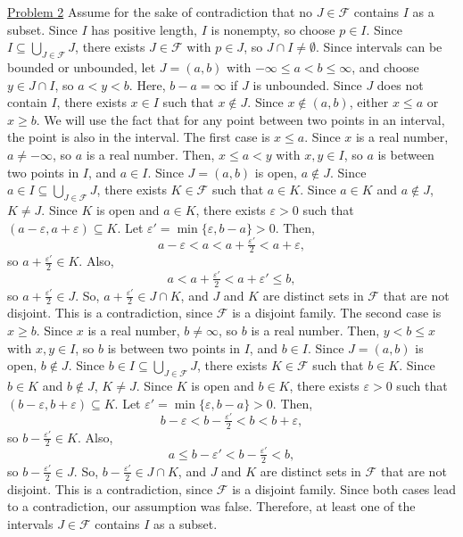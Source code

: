 \documentclass{exam}
\begin{document}
\underline{Problem 2}
\newline
\newline
Assume for the sake of contradiction that no $J\in\mathcal{F}$ contains $I$ as a subset. Since $I$ has positive length, $I$ is nonempty, so choose $p\in I$. Since $I\subseteq\bigcup_{J\in\mathcal{F}}J$, there exists $J\in\mathcal{F}$ with $p\in J$, so $J\cap I\neq\emptyset$. Since intervals can be bounded or unbounded, let $J=(a,b)$ with $-\infty\leq a<b\leq\infty$, and choose $y\in J\cap I$, so $a<y<b$. Here, $b-a=\infty$ if $J$ is unbounded.
\newline
\newline
Since $J$ does not contain $I$, there exists $x\in I$ such that $x\notin J$. Since $x\notin(a,b)$, either $x\leq a$ or $x\geq b$. We will use the fact that for any point between two points in an interval, the point is also in the interval.
\newline
\newline
The first case is $x\leq a$. Since $x$ is a real number, $a\neq-\infty$, so $a$ is a real number. Then, $x\leq a<y$ with $x,y\in I$, so $a$ is between two points in $I$, and $a\in I$. Since $J=(a,b)$ is open, $a\notin J$. Since $a\in I\subseteq\bigcup_{J\in\mathcal{F}}J$, there exists $K\in\mathcal{F}$ such that $a\in K$. Since $a\in K$ and $a\notin J$, $K\neq J$. Since $K$ is open and $a\in K$, there exists $\varepsilon>0$ such that $(a-\varepsilon,a+\varepsilon)\subseteq K$. Let $\varepsilon'=\min\{\varepsilon,b-a\}>0$. Then,
\[
    a-\varepsilon<a<a+\tfrac{\varepsilon'}{2}<a+\varepsilon,
\]
so $a+\frac{\varepsilon'}{2}\in K$. Also,
\[
    a<a+\tfrac{\varepsilon'}{2}<a+\varepsilon'\leq b,
\]
so $a+\frac{\varepsilon'}{2}\in J$. So, $a+\frac{\varepsilon'}{2}\in J\cap K$, and $J$ and $K$ are distinct sets in $\mathcal{F}$ that are not disjoint. This is a contradiction, since $\mathcal{F}$ is a disjoint family.
\newline
\newline
The second case is $x\geq b$. Since $x$ is a real number, $b\neq\infty$, so $b$ is a real number. Then, $y<b\leq x$ with $x,y\in I$, so $b$ is between two points in $I$, and $b\in I$. Since $J=(a,b)$ is open, $b\notin J$. Since $b\in I\subseteq\bigcup_{J\in\mathcal{F}}J$, there exists $K\in\mathcal{F}$ such that $b\in K$. Since $b\in K$ and $b\notin J$, $K\neq J$. Since $K$ is open and $b\in K$, there exists $\varepsilon>0$ such that $(b-\varepsilon,b+\varepsilon)\subseteq K$. Let $\varepsilon'=\min\{\varepsilon,b-a\}>0$. Then,
\[
    b-\varepsilon<b-\tfrac{\varepsilon'}{2}<b<b+\varepsilon,
\]
so $b-\frac{\varepsilon'}{2}\in K$. Also,
\[
    a\leq b-\varepsilon'<b-\tfrac{\varepsilon'}{2}<b,
\]
so $b-\frac{\varepsilon'}{2}\in J$. So, $b-\frac{\varepsilon'}{2}\in J\cap K$, and $J$ and $K$ are distinct sets in $\mathcal{F}$ that are not disjoint. This is a contradiction, since $\mathcal{F}$ is a disjoint family.
\newline
\newline
Since both cases lead to a contradiction, our assumption was false. Therefore, at least one of the intervals $J\in\mathcal{F}$ contains $I$ as a subset.
\newline
\end{document}
